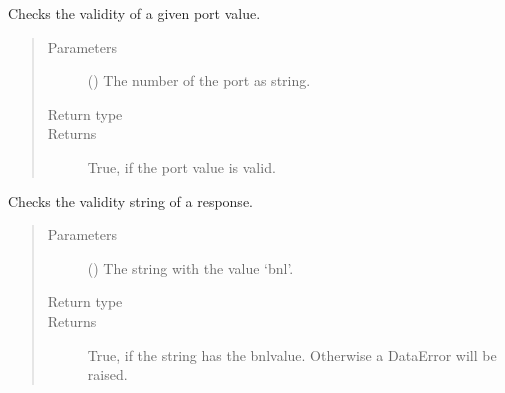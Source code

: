 \documentclass[letterpaper,10pt,english]{sphinxmanual}
\begin{document}
\begin{fulllineitems}
\label{\detokenize{index:secondodb.api.support.secondoparser.check_port}}
Checks the validity of a given port value.
\begin{quote}\begin{description}
\item[{Parameters}] \leavevmode
{} () \textendash{} The number of the port as string.

\item[{Return type}] \leavevmode
{}

\item[{Returns}] \leavevmode
True, if the port value is valid.

\end{description}\end{quote}

\end{fulllineitems}


\begin{fulllineitems}
\label{\detokenize{index:secondodb.api.support.secondoparser.check_validity_string}}
Checks the validity string of a  response.
\begin{quote}\begin{description}
\item[{Parameters}] \leavevmode
{} () \textendash{} The string with the value ‘bnl’.

\item[{Return type}] \leavevmode
{}

\item[{Returns}] \leavevmode
True, if the string has the bnl\sphinxhyphen{}value. Otherwise a DataError will be raised.

\end{description}\end{quote}

\end{fulllineitems}
\end{document}
